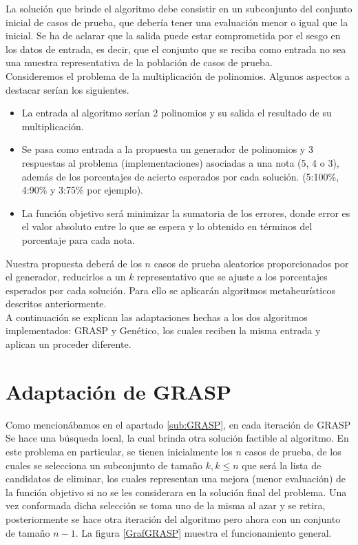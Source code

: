\documentclass[a4paper,12pt]{book}
\begin{document}
	La solución que brinde el algoritmo debe consistir en un subconjunto del conjunto inicial de casos de prueba, que debería tener una evaluación menor o igual que la inicial. Se ha de aclarar que la salida puede estar comprometida por el sesgo en los datos de entrada, es decir, que el conjunto que se reciba como entrada no sea una muestra representativa de la población de casos de prueba. \\
	
	Consideremos el problema de la multiplicación de polinomios. Algunos aspectos a destacar serían los siguientes.
	\begin{itemize}
		\item La entrada al algoritmo serían 2 polinomios y su salida el resultado de su multiplicación.
		\item Se pasa como entrada a la propuesta un generador de polinomios y 3 respuestas al problema (implementaciones) asociadas a una nota (5, 4 o 3), además de los porcentajes de acierto esperados por cada solución. (5:100\%, 4:90\% y 3:75\% por ejemplo).
		\item La función objetivo será minimizar la sumatoria de los errores, donde error es el valor absoluto entre lo que se espera y lo obtenido en términos del porcentaje para cada nota.
	\end{itemize}

	Nuestra propuesta deberá de los $n$ casos de prueba aleatorios proporcionados por el generador, reducirlos a un $k$ representativo que se ajuste a los porcentajes esperados por cada solución. Para ello se aplicarán algoritmos metaheurísticos descritos anteriormente. \\
	
	A continuación se explican las adaptaciones hechas a los dos algoritmos implementados: GRASP y Genético, los cuales reciben la misma entrada y aplican un proceder diferente.
	
	\section{Adaptación de GRASP}
		Como mencionábamos en el apartado \ref{sub:GRASP}, en cada iteración de GRASP Se hace una búsqueda local, la cual brinda otra solución factible al algoritmo. En este problema en particular, se tienen inicialmente los $n$ casos de prueba, de los cuales se selecciona un subconjunto de tamaño $k, k \leq n$ que será la lista de candidatos de eliminar, los cuales representan una mejora (menor evaluación) de la función objetivo si no se les considerara en la solución final del problema. Una vez conformada dicha selección se toma uno de la misma al azar y se retira, posteriormente se hace otra iteración del algoritmo pero ahora con un conjunto de tamaño $n-1$. La figura \ref{GrafGRASP} muestra el funcionamiento general.
		
\end{document}
